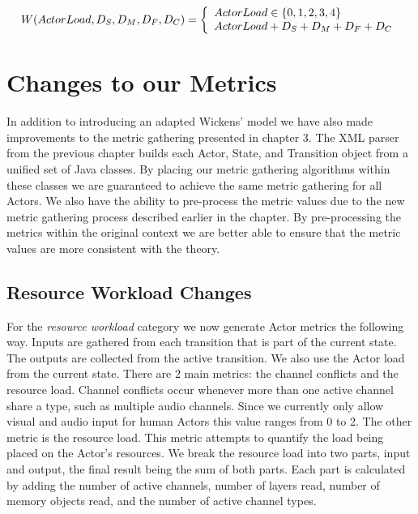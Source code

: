 \begin{equation}
W(ActorLoad, D_{S}, D_{M}, D_{F}, D_{C}) = \left\{ 
  \begin{array}{l l}
    ActorLoad \in \{0,1,2,3,4\}\\
    ActorLoad + D_{S} + D_{M} + D_{F} + D_{C}
  \end{array}
  \right.
  \label{eq:adapted_wickens_model}
\end{equation}


\section{Changes to our Metrics}
In addition to introducing an adapted Wickens' model we have also made improvements to the metric gathering presented in chapter 3.  The XML parser from the previous chapter builds each Actor, State, and Transition object from a unified set of Java classes.  By placing our metric gathering algorithms within these classes we are guaranteed to achieve the same metric gathering for all Actors.  We also have the ability to pre-process the metric values due to the new metric gathering process described earlier in the chapter.  By pre-processing the metrics within the original context we are better able to ensure that the metric values are more consistent with the theory.  

\subsection{Resource Workload Changes}
For the \textit{resource workload} category we now generate Actor metrics the following way.  Inputs are gathered from each transition that is part of the current state.  The outputs are collected from the active transition.  We also use the Actor load from the current state.  There are 2 main metrics: the channel conflicts and the resource load.  Channel conflicts occur whenever more than one active channel share a type, such as multiple audio channels.  Since we currently only allow visual and audio input for human Actors this value ranges from 0 to 2.  The other metric is the resource load.  This metric attempts to quantify the load being placed on the Actor's resources.  We break the resource load into two parts, input and output, the final result being the sum of both parts.  Each part is calculated by adding the number of active channels, number of layers read, number of memory objects read, and the number of active channel types.

